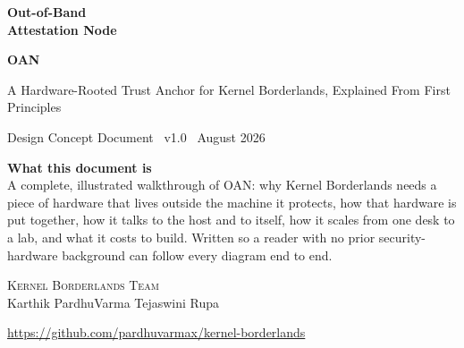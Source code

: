 \documentclass[11pt,a4paper]{article}
\begin{document}
\begin{titlepage}
\thispagestyle{empty}
\centering
\vspace*{\fill}

{\small{}}

\vspace{1.6cm}

{\fontsize{34}{40}\selectfont\bfseries Out-of-Band\\[0.15em] Attestation Node}

\vspace{0.6em}

{\Large\bfseries OAN}

\vspace{0.9em}

{\normalsize A Hardware-Rooted Trust Anchor for Kernel Borderlands, Explained From First Principles}

\vspace{1.2cm}

{\small Design Concept Document \textbullet\ v1.0 \textbullet\ August 2026}

\vspace*{\fill}

\begin{minipage}{0.82\linewidth}
\centering
\small
\textbf{What this document is} \\[0.3em]
A complete, illustrated walkthrough of OAN: why Kernel Borderlands needs a
piece of hardware that lives outside the machine it protects, how that
hardware is put together, how it talks to the host and to itself, how it
scales from one desk to a lab, and what it costs to build. Written so a
reader with no prior security-hardware background can follow every
diagram end to end.
\end{minipage}

\vspace{1.4cm}

{\small \scshape Kernel Borderlands Team}\\[0.9em]
\small Karthik \hspace{0.5cm}\textbullet\hspace{0.5cm} PardhuVarma \hspace{0.5cm}\textbullet\hspace{0.5cm} Tejaswini \hspace{0.5cm}\textbullet\hspace{0.5cm} Rupa

\vspace{0.9em}
{\small \url{https://github.com/pardhuvarmax/kernel-borderlands}}

\vspace{1.5cm}
\end{titlepage}
\end{document}
